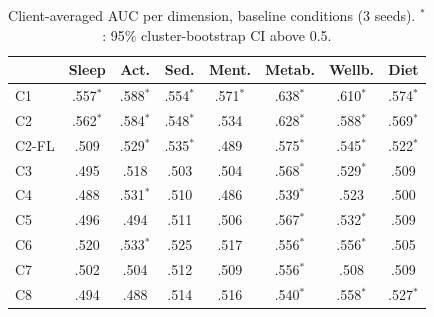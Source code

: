\begin{table}[t]
\caption{Client-averaged AUC per dimension, baseline conditions (3 seeds). $^{*}$: 95\% cluster-bootstrap CI above 0.5.}
\label{tab:popauc}
\centering\small
\setlength{\tabcolsep}{2.2pt}
\begin{tabular}{@{}lccccccc@{}}
\toprule
 & Sleep & Act. & Sed. & Ment. & Metab. & Wellb. & Diet \\
\midrule
C1    & .557$^{*}$ & .588$^{*}$ & .554$^{*}$ & .571$^{*}$ & .638$^{*}$ & .610$^{*}$ & .574$^{*}$ \\
C2    & .562$^{*}$ & .584$^{*}$ & .548$^{*}$ & .534 & .628$^{*}$ & .588$^{*}$ & .569$^{*}$ \\
C2-FL & .509 & .529$^{*}$ & .535$^{*}$ & .489 & .575$^{*}$ & .545$^{*}$ & .522$^{*}$ \\
C3    & .495 & .518 & .503 & .504 & .568$^{*}$ & .529$^{*}$ & .509 \\
C4    & .488 & .531$^{*}$ & .510 & .486 & .539$^{*}$ & .523 & .500 \\
C5    & .496 & .494 & .511 & .506 & .567$^{*}$ & .532$^{*}$ & .509 \\
C6    & .520 & .533$^{*}$ & .525 & .517 & .556$^{*}$ & .556$^{*}$ & .505 \\
C7    & .502 & .504 & .512 & .509 & .556$^{*}$ & .508 & .509 \\
C8    & .494 & .488 & .514 & .516 & .540$^{*}$ & .558$^{*}$ & .527$^{*}$ \\
\bottomrule
\end{tabular}
\end{table}
